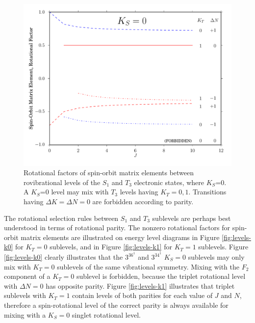 \documentclass[12pt]{mitthesis}
\begin{document}
\begin{figure}
  \caption{Rotational factors of spin-orbit matrix elements between
    rovibrational levels of the $S_1$ and $T_3$ electronic states,
    where $K_S$=0.  A $K_S$=0 level may mix with $T_3$ levels having
    $K_T=0,1$.  Transitions having $\Delta K = \Delta N = 0$ are
    forbidden according to parity.}
  \label{fig:rotational-factors}
  \centering
  \includegraphics[width=6in]{rotational-factors-k0.pdf}
\end{figure}


The rotational selection rules between $S_1$ and $T_3$ sublevels are
perhaps best understood in terms of rotational parity.  The nonzero
rotational factors for spin-orbit matrix elements are illustrated on
energy level diagrams in Figure \ref{fig:levels-k0} for $K_T=0$
sublevels, and in Figure \ref{fig:levels-k1} for $K_T=1$ sublevels.
Figure \ref{fig:levels-k0} clearly illustrates that the $3^36^1$ and
$3^34^1$ $K_S=0$ sublevels may only mix with $K_T=0$ sublevels of the
same vibrational symmetry.  Mixing with the $F_2$ component of a
$K_T=0$ sublevel is forbidden, because the triplet rotational level
with $\Delta N=0$ has opposite parity.  Figure \ref{fig:levels-k1}
illustrates that triplet sublevels with $K_T=1$ contain levels of both
parities for each value of $J$ and $N$, therefore a spin-rotational
level of the correct parity is always available for mixing with a
$K_S=0$ singlet rotational level.
\end{document}
